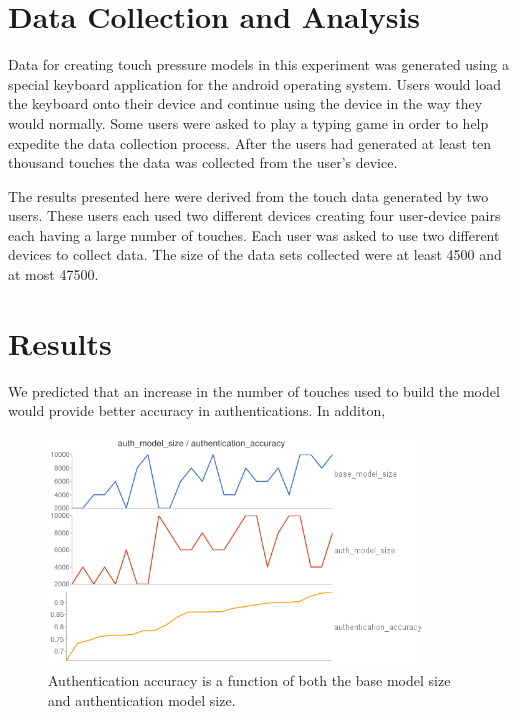 \documentclass{acm_proc_article-sp}
\begin{document}
\section{Data Collection and Analysis}
\label{sec:data_collection}
Data for creating touch pressure models in this experiment was generated using a special keyboard application for the android operating system. Users would load the keyboard onto their device and continue using the device in the way they would normally. Some users were asked to play a typing game in order to help expedite the data collection process. After the users had generated at least ten thousand touches the data was collected from the user's device.

The results presented here were derived from the touch data generated by two users. These users each used two different devices creating four user-device pairs each having a large number of touches.
Each user was asked to use two different devices to collect data.
The size of the data sets collected were at least 4500 and at most 47500.



\section{Results}
\label{sec:results}
We predicted that an increase in the number of touches used to build the model would provide better accuracy in authentications. 
In additon, 

\begin{figure}
\centering
\includegraphics[width=3.9in]{authentication_accuracy_vs_model_size.png}
\caption{Authentication accuracy is a function of both the base model size and authentication model size.}
\label{fig:authentication_accuracy}
\end{figure}
\end{document}
